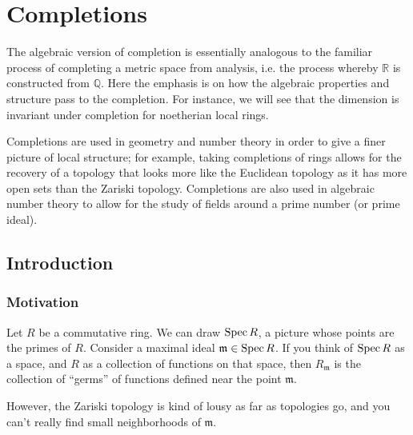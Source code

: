 \chapter{Completions}
\label{completions}

The algebraic version of completion is essentially analogous to the familiar
process of completing a metric space from analysis, i.e. the process whereby $\mathbb{R}$ is constructed from
$\mathbb{Q}$. Here the emphasis is on how the algebraic properties and
structure pass to the completion. For instance, we will see that the
dimension is invariant under completion for noetherian local rings.


Completions are used in geometry and number theory in order to give a finer picture of local structure; for example, taking completions of rings allows for the recovery of a topology that looks more like the Euclidean topology as it has more open sets than the Zariski topology. Completions are also used in algebraic number theory to allow for the study of fields around a prime number (or prime ideal). 

\section{Introduction}

\subsection{Motivation}
Let $R$ be a commutative ring. We can draw $\operatorname{Spec} R$, a picture whose
points are the primes of $R$. Consider a maximal ideal $\mathfrak{m} \in \operatorname{Spec}
R$. If you think of $\operatorname{Spec} R$ as a space, and $R$ as a collection of functions
on that space, then $R_{\mathfrak{m}}$ is the collection of ``germs'' of
functions defined near the point $\mathfrak{m}$. 

However, the Zariski topology is kind of lousy as far as topologies go, and you can't
really find small neighborhoods of $\mathfrak{m}$.

